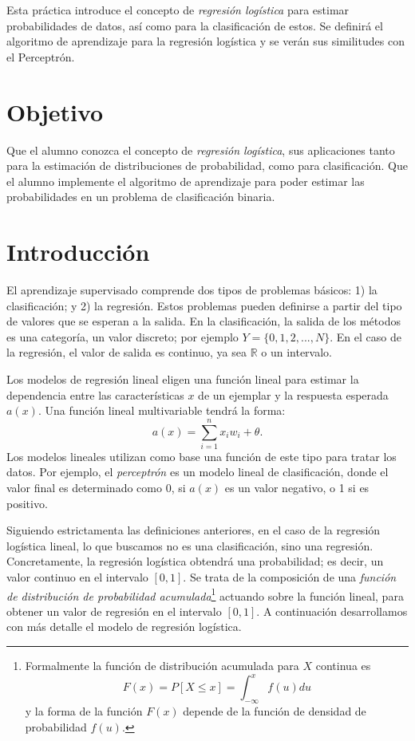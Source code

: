 
Esta práctica introduce el concepto de \emph{regresión logística} para estimar probabilidades de datos, así como para la clasificación de estos. Se definirá el algoritmo de aprendizaje para la regresión logística y se verán sus similitudes con el Perceptrón.


\section{Objetivo}

Que el alumno conozca el concepto de \textit{regresión logística}, sus aplicaciones tanto para la estimación de distribuciones de probabilidad, como para clasificación. Que el alumno implemente el algoritmo de aprendizaje para poder estimar las probabilidades en un problema de clasificación binaria.

\section{Introducción}

El aprendizaje supervisado comprende dos tipos de problemas básicos: 1) la clasificación; y 2) la regresión. Estos problemas pueden definirse a partir del tipo de valores que se esperan a la salida. En la clasificación, la salida de los métodos es una categoría, un valor discreto; por ejemplo $Y = \{0,1,2,...,N\}$. En el caso de la regresión, el valor de salida es continuo, ya sea $\mathbb{R}$ o un intervalo.

Los modelos de regresión lineal eligen una función lineal para estimar la dependencia entre las características $x$ de un ejemplar y la respuesta esperada $a(x)$. Una función lineal multivariable tendrá la forma: $$a(x) = \sum_{i=1}^n x_iw_i + \theta.$$
Los modelos lineales utilizan como base una función de este tipo para tratar los datos. Por ejemplo, el \textit{perceptrón} es un modelo lineal de clasificación, donde el valor final es determinado como 0, si $a(x)$ es un valor negativo, o 1 si es positivo.

Siguiendo estrictamenta las definiciones anteriores, en el caso de la regresión logística lineal, lo que buscamos no es una clasificación, sino una regresión. Concretamente, la regresión logística obtendrá una probabilidad; es decir, un valor continuo en el intervalo $[0,1]$.  Se trata de la composición de una \emph{función de distribución de probabilidad acumulada}\footnote{Formalmente la función de distribución acumulada para $X$ continua es $$F(x) = P[X \leq x] =\int_{-\infty}^{x} f(u) du$$ y la forma de la función $F(x)$ depende de la función de densidad de probabilidad $f(u)$.} actuando sobre la función lineal, para obtener un valor de regresión en el intervalo $[0,1]$. A continuación desarrollamos con más detalle el modelo de regresión logística.


